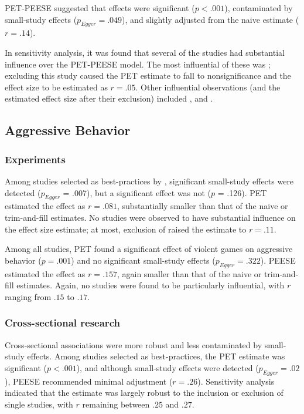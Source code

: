 \documentclass[man]{apa6}
\begin{document}
PET-PEESE suggested that effects were significant ($p < .001$), contaminated by small-study effects ($p_{Egger} = .049$), and slightly adjusted from the naive estimate ($r = .14$).

In sensitivity analysis, it was found that several of the studies had substantial influence over the PET-PEESE model. The most influential of these was \citet{Uozumi:2006}; excluding this study caused the PET estimate to fall to nonsignificance and the effect size to be estimated as $r = .05$. Other influential observations (and the estimated effect size after their exclusion) included \citet[study 2, $r = .13$]{Matsuzaki:etal:2004}, and \citet[$r = .16$]{Yukawa:Sakamoto:2001}.

\subsection{Aggressive Behavior}
\subsubsection{Experiments}
Among studies selected as best-practices by \citet{Anderson:etal:2010}, significant small-study effects were detected ($p_{Egger}$ = .007), but a significant effect was not ($p$ = .126). PET estimated the effect as $r = .081$, substantially smaller than that of the naive or trim-and-fill estimates. No studies were observed to have substantial influence on the effect size estimate; at most, exclusion of \citet{Anderson:etal:2007} raised the estimate to $r = .11$.

Among all studies, PET found a significant effect of violent games on aggressive behavior ($p = .001$) and no significant small-study effects ($p_{Egger} = .322$). PEESE estimated the effect as $r = .157$, again smaller than that of the naive or trim-and-fill estimates. Again, no studies were found to be particularly influential, with $r$ ranging from $.15$ to $.17$.

\subsubsection{Cross-sectional research}
Cross-sectional associations were more robust and less contaminated by small-study effects. Among studies selected as best-practices, the PET estimate was significant ($p < .001$), and although small-study effects were detected ($p_{Egger} = .02$), PEESE recommended minimal adjustment ($r = .26$). Sensitivity analysis indicated that the estimate was largely robust to the inclusion or exclusion of single studies, with $r$ remaining between $.25$ and $.27$. 
\end{document}
